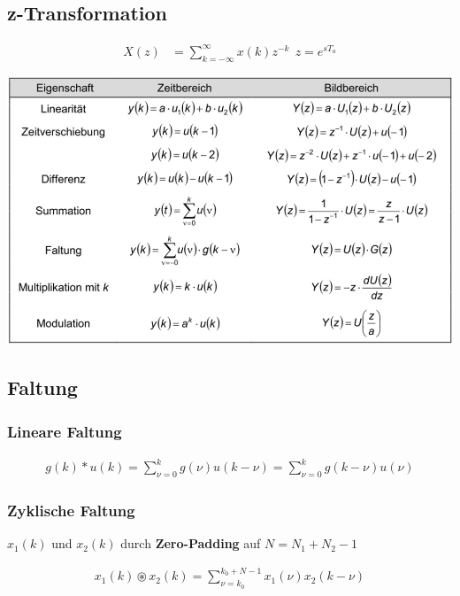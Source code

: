 \documentclass[10pt,a4paper]{article}
\begin{document}
  \subsection{z-Transformation}
  \begin{mdframed}[style=exercise]
    \begin{align}
        X(z) &=\sum_{k=-\infty}^{\infty} x(k)z^{-k} \ \ z=e^{s T_a}
    \end{align}
  \end{mdframed}
  \begin{center}
      \includegraphics[width=.35\textwidth]{./img/z.png}
  \end{center}
  \subsection{Faltung}
  \subsubsection{Lineare Faltung}
  \begin{mdframed}[style=exercise]
    \begin{align}
        g(k)*u(k) = \sum_{\nu =0}^{k} g(\nu) u(k-\nu)= \sum_{\nu =0}^{k} g(k-\nu) u(\nu)
    \end{align}
  \end{mdframed}
  \subsubsection{Zyklische Faltung}
  $x_1(k)$ und $x_2(k)$ durch \textbf{Zero-Padding} auf $N = N_1 +N_2 -1$ 
  \begin{mdframed}[style=exercise]
    \begin{align}
        x_1(k) \circledast x_2(k) = \sum_{\nu =k_0}^{k_0+N-1} x_1(\nu) x_2(k-\nu)
    \end{align}
  \end{mdframed}
\end{document}
